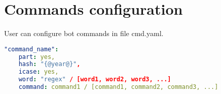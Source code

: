 




\section{Commands configuration}
User can configure bot commands in file cmd.yaml.
\begin{lstlisting}[language=yaml]
"command_name":
    part: yes,
    hash: "{@year@}",
    icase: yes,
    word: "regex" / [word1, word2, word3, ...]
    command: command1 / [command1, command2, command3, ...]
\end{lstlisting}



